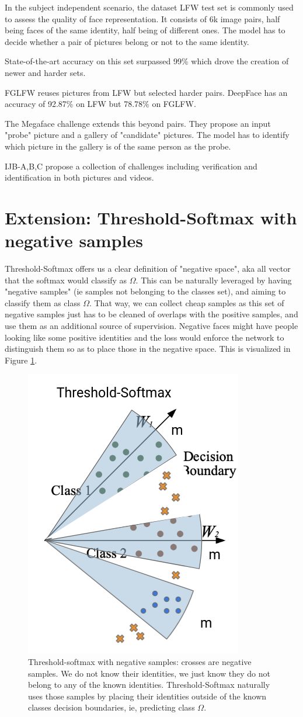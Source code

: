 In the subject independent scenario, the dataset LFW \citep{lfw} test set is commonly used to assess the quality of face representation. It consists of 6k image pairs, half being faces of the same identity, half being of different ones. The model has to decide whether a pair of pictures belong or not to the same identity.

State-of-the-art accuracy on this set surpassed 99\% which drove the creation of newer and harder sets.

FGLFW \citep{fglfw} reuses pictures from LFW but selected harder pairs. DeepFace has an accuracy of 92.87\% on LFW but 78.78\% on FGLFW.

The Megaface challenge \citep{megaface} extends this beyond pairs. They propose an input "probe" picture and a gallery of "candidate" pictures. The model has to identify which picture in the gallery is of the same person as the probe.

IJB-{A,B,C} propose a collection of challenges including verification and identification in both pictures and videos.


\section{Extension: Threshold-Softmax with negative samples}

Threshold-Softmax offers us a clear definition of "negative space", aka all vector that the softmax would classify as $\Omega$. This can be naturally leveraged by having "negative samples" (ie samples not belonging to the classes set), and aiming to classify them as class $\Omega$. That way, we can collect cheap samples as this set of negative samples just has to be cleaned of overlaps with the positive samples, and use them as an additional source of supervision. Negative faces might have people looking like some positive identities and the loss would enforce the network to distinguish them so as to place those in the negative space. This is visualized in Figure \ref{fig:neg-tsm}.

\begin{figure}
    \centering
    \includegraphics[width=0.25\columnwidth]{50-files/tsm-neg.png}
    \caption{Threshold-softmax with negative samples: crosses are negative samples. We do not know their identities, we just know they do not belong to any of the known identities. Threshold-Softmax naturally uses those samples by placing their identities outside of the known classes decision boundaries, ie, predicting class $\Omega$.}
    \label{fig:neg-tsm}
\end{figure}

